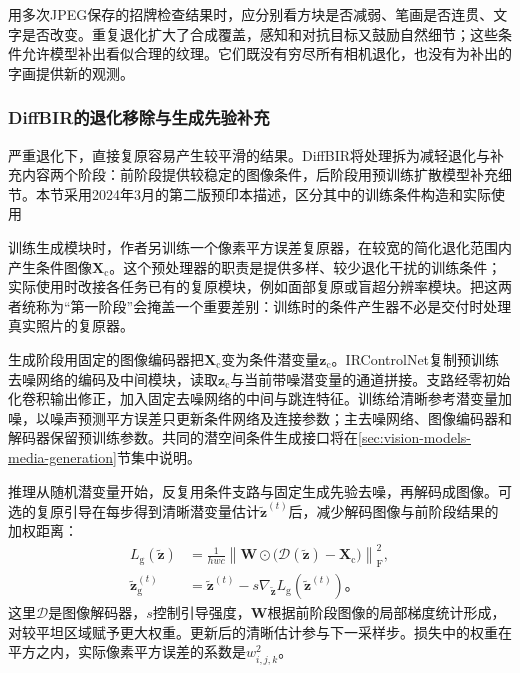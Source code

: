 用多次JPEG保存的招牌检查结果时，应分别看方块是否减弱、笔画是否连贯、文字是否改变。重复退化扩大了合成覆盖，感知和对抗目标又鼓励自然细节；这些条件允许模型补出看似合理的纹理。它们既没有穷尽所有相机退化，也没有为补出的字画提供新的观测。

\subsubsection{DiffBIR的退化移除与生成先验补充}
\label{sec:vision-restoration-diffbir}

严重退化下，直接复原容易产生较平滑的结果。DiffBIR将处理拆为减轻退化与补充内容两个阶段：前阶段提供较稳定的图像条件，后阶段用预训练扩散模型补充细节。本节采用2024年3月的第二版预印本描述，区分其中的训练条件构造和实际使用

训练生成模块时，作者另训练一个像素平方误差复原器，在较宽的简化退化范围内产生条件图像$\bm{X}_{\mathrm{c}}$。这个预处理器的职责是提供多样、较少退化干扰的训练条件；实际使用时改接各任务已有的复原模块，例如面部复原或盲超分辨率模块。把这两者统称为“第一阶段”会掩盖一个重要差别：训练时的条件产生器不必是交付时处理真实照片的复原器。

生成阶段用固定的图像编码器把$\bm{X}_{\mathrm{c}}$变为条件潜变量$\bm{z}_{\mathrm{c}}$。IRControlNet复制预训练去噪网络的编码及中间模块，读取$\bm{z}_{\mathrm{c}}$与当前带噪潜变量的通道拼接。支路经零初始化卷积输出修正，加入固定去噪网络的中间与跳连特征。训练给清晰参考潜变量加噪，以噪声预测平方误差只更新条件网络及连接参数；主去噪网络、图像编码器和解码器保留预训练参数。共同的潜空间条件生成接口将在\ref{sec:vision-models-media-generation}节集中说明。

推理从随机潜变量开始，反复用条件支路与固定生成先验去噪，再解码成图像。可选的复原引导在每步得到清晰潜变量估计$\tilde{\bm{z}}^{(t)}$后，减少解码图像与前阶段结果的加权距离：
\begin{equation}
 \begin{aligned}
 L_{\mathrm{g}}(\tilde{\bm{z}})
 &=\frac{1}{hwc}
   \left\lVert\bm{W}\odot
    \bigl(\mathcal{D}(\tilde{\bm{z}})-\bm{X}_{\mathrm{c}}\bigr)
   \right\rVert_{\mathrm{F}}^2,\\
 \tilde{\bm{z}}_{\mathrm{g}}^{(t)}
 &=\tilde{\bm{z}}^{(t)}
   -s\nabla_{\tilde{\bm{z}}}L_{\mathrm{g}}
       (\tilde{\bm{z}}^{(t)})\text{。}
 \end{aligned}
 \label{eq:vision-diffbir-guidance}
\end{equation}
这里$\mathcal{D}$是图像解码器，$s$控制引导强度，$\bm{W}$根据前阶段图像的局部梯度统计形成，对较平坦区域赋予更大权重。更新后的清晰估计参与下一采样步。损失中的权重在平方之内，实际像素平方误差的系数是$w_{i,j,k}^2$。

